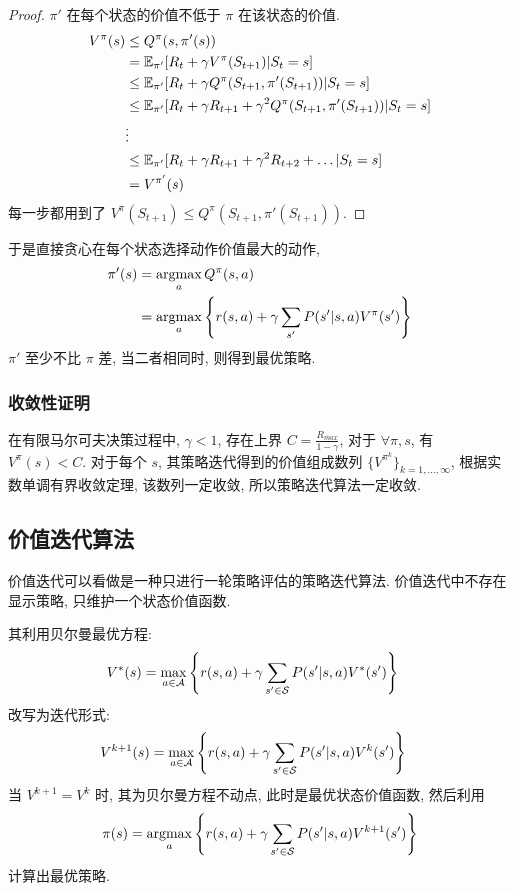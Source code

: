 \begin{proof}
    $\pi'$ 在每个状态的价值不低于 $\pi$ 在该状态的价值.
    \begin{align*}
        V^\pi(s)&\le Q^\pi(s, \pi'(s))\\
        &= \mathbb{E}_{\pi'}[R_t + \gamma V^\pi(S_{t+1})|S_t=s]\\
        &\le \mathbb{E}_{\pi'}[R_t + \gamma Q^\pi(S_{t+1}, \pi'(S_{t+1}))|S_t=s]\\
        &\le \mathbb{E}_{\pi'}[R_t + \gamma R_{t+1} + \gamma^2 Q^\pi(S_{t+1}, \pi'(S_{t+1}))|S_t=s]\\
        &\vdots\\
        &\le \mathbb{E}_{\pi'}[R_t + \gamma R_{t+1} + \gamma^2 R_{t+2} + \dots |S_t=s]\\
        &= V^{\pi'}(s)
    \end{align*}
    每一步都用到了 $V^\pi(S_{t+1})\le Q^\pi(S_{t+1}, \pi'(S_{t+1}))$.
\end{proof}

于是直接贪心在每个状态选择动作价值最大的动作,
\begin{align*}
    \pi'(s)&=\operatorname*{argmax}_a Q^\pi(s,a)\\
    &=\operatorname*{argmax}_a \left\{ r(s,a) + \gamma \sum_{s'}P(s'|s,a)V^\pi(s') \right\}
\end{align*}
$\pi'$ 至少不比 $\pi$ 差, 当二者相同时, 则得到最优策略. 

\subsubsection{收敛性证明}

在有限马尔可夫决策过程中, $\gamma<1$, 存在上界 $C=\frac{R_{max}}{1-\gamma}$, 对于 $\forall \pi, s$, 有 $V^\pi(s)<C$. 对于每个 $s$, 其策略迭代得到的价值组成数列 $\{ V^{\pi^k} \}_{k=1,\dots,\infty}$, 根据实数单调有界收敛定理, 该数列一定收敛, 所以策略迭代算法一定收敛. 


\subsection{价值迭代算法}
价值迭代可以看做是一种只进行一轮策略评估的策略迭代算法. 价值迭代中不存在显示策略, 只维护一个状态价值函数. 

其利用贝尔曼最优方程:
\begin{align*}
    V^*(s)&=\max_{a\in\mathcal{A}}\left\{ r(s,a) + \gamma \sum_{s'\in\mathcal{S}} P(s'|s,a) V^*(s') \right\}
\end{align*}
改写为迭代形式:
\begin{align*}
    V^{k+1}(s)&=\max_{a\in\mathcal{A}}\left\{ r(s,a) + \gamma \sum_{s'\in\mathcal{S}} P(s'|s,a) V^k(s') \right\}
\end{align*}
当 $V^{k+1}=V^k$ 时, 其为贝尔曼方程不动点, 此时是最优状态价值函数, 然后利用
\begin{align*}
    \pi(s)=\operatorname*{argmax}_a\left\{ r(s,a) + \gamma \sum_{s'\in\mathcal{S}}P(s'|s,a)V^{k+1}(s')  \right\}
\end{align*}
计算出最优策略.

